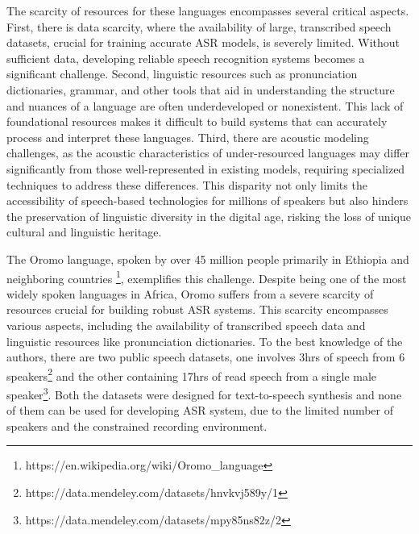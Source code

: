 \documentclass[conference, 9pt]{IEEEtran}
\begin{document}
The scarcity of resources for these languages encompasses several critical aspects. First, there is data scarcity, where the availability of large, transcribed speech datasets, crucial for training accurate ASR models, is severely limited. Without sufficient data, developing reliable speech recognition systems becomes a significant challenge. Second, linguistic resources such as pronunciation dictionaries, grammar, and other tools that aid in understanding the structure and nuances of a language are often underdeveloped or nonexistent. This lack of foundational resources makes it difficult to build systems that can accurately process and interpret these languages. Third, there are acoustic modeling challenges, as the acoustic characteristics of under-resourced languages may differ significantly from those well-represented in existing models, requiring specialized techniques to address these differences. This disparity not only limits the accessibility of speech-based technologies for millions of speakers but also hinders the preservation of linguistic diversity in the digital age, risking the loss of unique cultural and linguistic heritage.

The Oromo language, spoken by over 45 million people primarily in Ethiopia and neighboring countries \footnote{https://en.wikipedia.org/wiki/Oromo\_language}, exemplifies this challenge. Despite being one of the most widely spoken languages in Africa, Oromo suffers from a severe scarcity of resources crucial for building robust ASR systems. 
This scarcity encompasses various aspects, including the availability of transcribed speech data and linguistic resources like pronunciation dictionaries. To the best knowledge of the authors, there are two public speech datasets, one involves 3hrs of speech from 6 speakers\footnote{https://data.mendeley.com/datasets/hnvkvj589y/1} and the other containing 17hrs of read speech from a single male speaker\footnote{https://data.mendeley.com/datasets/mpy85ns82z/2}. Both the datasets were designed for text-to-speech synthesis and none of them can be used for developing ASR system, due to the limited number of speakers and the constrained recording environment. 
\end{document}
